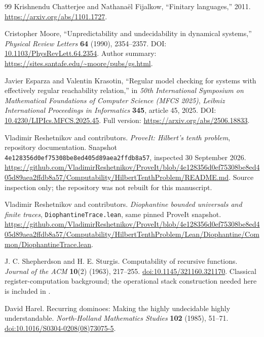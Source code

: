 \documentclass[11pt,letterpaper]{article}
\theoremstyle{definition}
\theoremstyle{remark}
\newcommand{\sha}{\texttt{4e128356d0ef75308be8ed405d89aea2ffdb8a57}}
\newcommand{\1}{\mathbf 1}
\begin{document}
\begin{thebibliography}{99}
Krishnendu Chatterjee and Nathana\"el Fijalkow,
``Finitary languages,'' 2011.
\url{https://arxiv.org/abs/1101.1727}.

Cristopher Moore, ``Unpredictability and undecidability in dynamical systems,''
\emph{Physical Review Letters} \textbf{64} (1990), 2354--2357.
DOI: \href{https://doi.org/10.1103/PhysRevLett.64.2354}{10.1103/PhysRevLett.64.2354}.
Author summary: \url{https://sites.santafe.edu/~moore/pubs/gs.html}.

Javier Esparza and Valentin Krasotin,
``Regular model checking for systems with effectively regular reachability
relation,'' in \emph{50th International Symposium on Mathematical
Foundations of Computer Science (MFCS 2025)},
\emph{Leibniz International Proceedings in Informatics} \textbf{345},
article 45, 2025.
DOI: \href{https://doi.org/10.4230/LIPIcs.MFCS.2025.45}{10.4230/LIPIcs.MFCS.2025.45}.
Full version: \url{https://arxiv.org/abs/2506.18833}.

Vladimir Reshetnikov and contributors.
\emph{ProveIt: Hilbert's tenth problem}, repository documentation.
Snapshot \sha, inspected 30 September 2026.
\url{https://github.com/VladimirReshetnikov/ProveIt/blob/4e128356d0ef75308be8ed405d89aea2ffdb8a57/Computability/HilbertTenthProblem/README.md}.
Source inspection only; the repository was not rebuilt for this manuscript.

Vladimir Reshetnikov and contributors.
\emph{Diophantine bounded universals and finite traces},
\texttt{DiophantineTrace.lean}, same pinned ProveIt snapshot.
\url{https://github.com/VladimirReshetnikov/ProveIt/blob/4e128356d0ef75308be8ed405d89aea2ffdb8a57/Computability/HilbertTenthProblem/Lean/Diophantine/Common/DiophantineTrace.lean}.

J. C. Shepherdson and H. E. Sturgis.
Computability of recursive functions.
\emph{Journal of the ACM} \textbf{10}(2) (1963), 217--255.
\href{https://doi.org/10.1145/321160.321170}{doi:10.1145/321160.321170}.
Classical register-computation background; the operational stack construction
needed here is included in .

David Harel.
Recurring dominoes: Making the highly undecidable highly understandable.
\emph{North-Holland Mathematics Studies} \textbf{102} (1985), 51--71.
\href{https://doi.org/10.1016/S0304-0208(08)73075-5}{doi:10.1016/S0304-0208(08)73075-5}.


\end{thebibliography}
\end{document}
